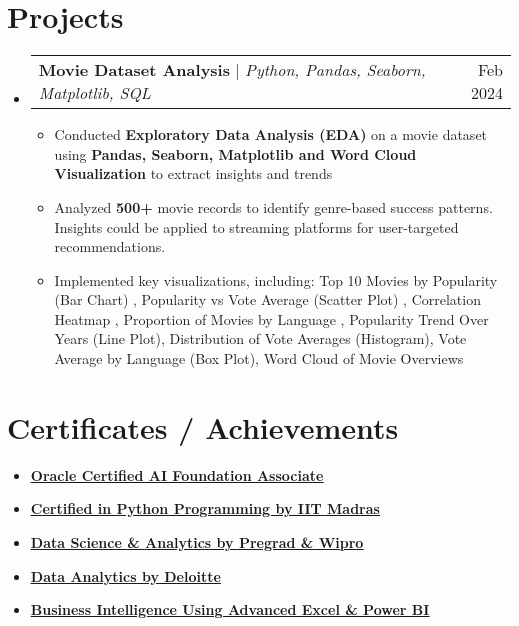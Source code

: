 \documentclass[letterpaper,11pt]{article}
\makeatletter
\newcommand{\resumeItem}[1]{
  \item\small{
    {#1 \vspace{-2pt}}
  }
}
\newcommand{\resumeProjectHeading}[2]{
    \item
    \begin{tabular*}{0.97\textwidth}{l@{\extracolsep{\fill}}r}
      \small#1 & #2 \\
    \end{tabular*}\vspace{-7pt}
}
\newcommand{\resumeSubHeadingListStart}{\begin{itemize}[leftmargin=0.15in, label={}]}
\newcommand{\resumeSubHeadingListEnd}{\end{itemize}}
\newcommand{\resumeItemListStart}{\begin{itemize}}
\newcommand{\resumeItemListEnd}{\end{itemize}\vspace{-5pt}}
\makeatother
\begin{document}
\section{Projects}
    \resumeSubHeadingListStart
      \resumeProjectHeading
          {\textbf{Movie Dataset Analysis} $|$ \emph{Python, Pandas, Seaborn, Matplotlib, SQL}}{Feb 2024}
          \resumeItemListStart
            \resumeItem{Conducted \textbf{Exploratory Data Analysis (EDA)} on a movie dataset using \textbf{Pandas, Seaborn, Matplotlib and Word Cloud Visualization} to extract insights and trends}
            \resumeItem{Analyzed \textbf{500+} movie records to identify genre-based success patterns. Insights could be applied to streaming platforms for user-targeted recommendations.}
            \resumeItem{Implemented key visualizations, including: Top 10 Movies by Popularity (Bar Chart) , Popularity vs Vote Average (Scatter Plot) , Correlation Heatmap , Proportion of Movies by Language , Popularity Trend Over Years (Line Plot), Distribution of Vote Averages (Histogram), Vote Average by Language (Box Plot), Word Cloud of Movie Overviews}
          \resumeItemListEnd
    \resumeSubHeadingListEnd

  \section{Certificates / Achievements}
\begin{itemize}[leftmargin=0.15in, label={}]
    \small{
        \item{
            \resumeItemListStart

                \resumeItem{\href{https://catalog-education.oracle.com/ords/certview/sharebadge?id=8D099CA3E47AC7B5935ED3EC3F98AF831216276360EC1356AECA960B6BABD757}{\underline{\textbf{Oracle Certified AI Foundation Associate}}}}
                \resumeItem{\href{https://drive.google.com/file/d/18rK_bqdGsZMk0qeUqgYJfLw1F75Tcemm/view?usp=drivesdk}{\underline{\textbf{Certified in Python Programming by IIT Madras}}}}

                \resumeItem{\href{https://drive.google.com/file/d/1Hx1IvsFIQTX3KnpI1TU-tnYFZXdKg6w2/view?usp=drivesdk}{\underline{\textbf{Data Science \& Analytics by Pregrad \& Wipro}}}}

                \resumeItem{\href{https://drive.google.com/file/d/1Ho9_lJv32kBDUTP9-cmJzo8jbMMJIZr1/view?usp=drivesdk}{\underline{\textbf{Data Analytics by Deloitte}}}}

                \resumeItem{\href{https://drive.google.com/file/d/19E2ZBopaJ9rMbQaqolORDVgSNjLkmAzq/view?usp=drivesdk}{\underline{\textbf{Business Intelligence Using Advanced Excel \& Power BI}}}}
            
                
                
                
            \resumeItemListEnd
        }
    }
\end{itemize}






\end{document}
